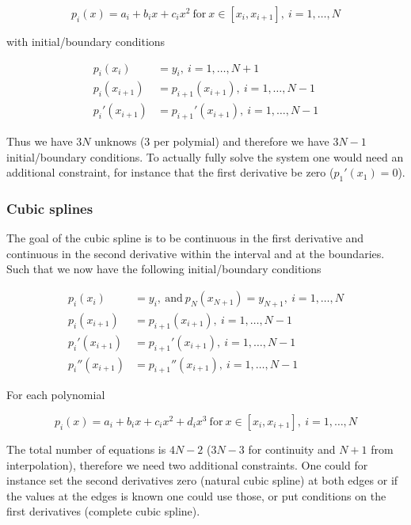 \documentclass[a4paper]{article}
\begin{document}
\begin{equation*}
    p_i(x)=a_i+b_ix+c_ix^2\ \text{for}\ x\in [x_i, x_{i+1}],\ i=1,\dots, N
\end{equation*}

with initial/boundary conditions

\begin{align*}
    p_i(x_i)&=y_i,\ i=1,\dots,N+1\\[1em] 
    p_i(x_{i+1})&=p_{i+1}(x_{i+1}),\ i=1,\dots,N-1\\[1em] 
    p_i'(x_{i+1})&=p_{i+1}'(x_{i+1}),\ i=1,\dots,N-1
\end{align*}

Thus we have $3N$ unknows (3 per polymial) and therefore we have $3N-1$ initial/boundary conditions. To actually fully solve the system one would need an additional constraint, for instance that the first derivative be zero ($p_1'(x_1)=0$).

\subsubsection{Cubic splines}

The goal of the cubic spline is to be continuous in the first derivative and continuous in the second derivative within the interval and at the boundaries. Such that we now have the following initial/boundary conditions

\begin{align*}
    p_i(x_i)&=y_i,\ \text{and}\ p_N(x_{N+1})=y_{N+1},\ i=1,\dots,N\\[1em] 
    p_i(x_{i+1})&=p_{i+1}(x_{i+1}),\ i=1,\dots,N-1\\[1em] 
    p_i'(x_{i+1})&=p_{i+1}'(x_{i+1}),\ i=1,\dots,N-1\\[1em] 
    p_i''(x_{i+1})&=p_{i+1}''(x_{i+1}),\ i=1,\dots,N-1
\end{align*}

For each polynomial 

\begin{equation*}
    p_i(x)=a_i+b_ix+c_ix^2+d_ix^3\ \text{for}\ x\in [x_i, x_{i+1}],\ i=1,\dots, N
\end{equation*}

The total number of equations is $4N-2$ ($3N-3$ for continuity and $N+1$ from interpolation), therefore we need two additional constraints. One could for instance set the second derivatives zero (natural cubic spline) at both edges or if the values at the edges is known one could use those, or put conditions on the first derivatives (complete cubic spline).
\end{document}
